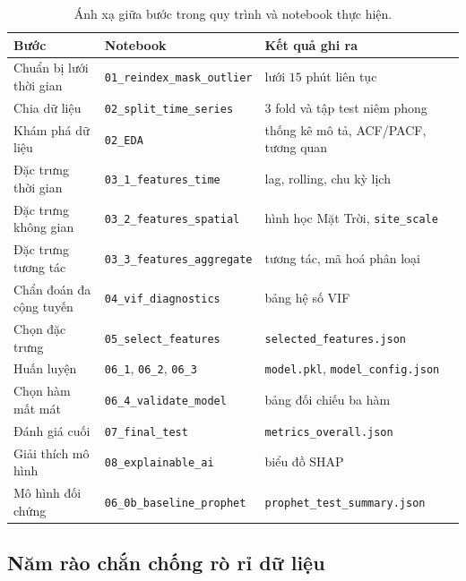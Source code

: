 \documentclass[12pt,a4paper]{article}
\renewcommand{\baselinestretch}{1.35}
\begin{document}
\begin{table}[htbp]
\centering
\caption{Ánh xạ giữa bước trong quy trình và notebook thực hiện.}
\label{tab:notebook_pipeline}
\footnotesize
\renewcommand{\baselinestretch}{1.0}\selectfont
\begin{tabular}{@{}p{4.1cm} p{4.6cm} p{4.7cm}@{}}
\toprule
\textbf{Bước} & \textbf{Notebook} & \textbf{Kết quả ghi ra} \\
\midrule
Chuẩn bị lưới thời gian & \texttt{01\_reindex\_mask\_outlier} & lưới $15$ phút liên tục \\
Chia dữ liệu & \texttt{02\_split\_time\_series} & $3$ fold và tập test niêm phong \\
Khám phá dữ liệu & \texttt{02\_EDA} & thống kê mô tả, ACF/PACF, tương quan \\
Đặc trưng thời gian & \texttt{03\_1\_features\_time} & lag, rolling, chu kỳ lịch \\
Đặc trưng không gian & \texttt{03\_2\_features\_spatial} & hình học Mặt Trời, \texttt{site\_scale} \\
Đặc trưng tương tác & \texttt{03\_3\_features\_aggregate} & tương tác, mã hoá phân loại \\
Chẩn đoán đa cộng tuyến & \texttt{04\_vif\_diagnostics} & bảng hệ số VIF \\
Chọn đặc trưng & \texttt{05\_select\_features} & \texttt{selected\_features.json} \\
Huấn luyện & \texttt{06\_1}, \texttt{06\_2}, \texttt{06\_3} & \texttt{model.pkl}, \texttt{model\_config.json} \\
Chọn hàm mất mát & \texttt{06\_4\_validate\_model} & bảng đối chiếu ba hàm \\
Đánh giá cuối & \texttt{07\_final\_test} & \texttt{metrics\_overall.json} \\
Giải thích mô hình & \texttt{08\_explainable\_ai} & biểu đồ SHAP \\
Mô hình đối chứng & \texttt{06\_0b\_baseline\_prophet} & \texttt{prophet\_test\_summary.json} \\
\bottomrule
\end{tabular}
\end{table}

\subsection{Năm rào chắn chống rò rỉ dữ liệu}
\end{document}
